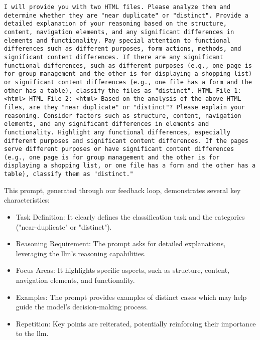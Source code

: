     \begin{lstlisting}[breaklines, caption={Final User Prompt},captionpos=b, label={lst:UsrPrompt}]
    I will provide you with two HTML files. Please analyze them and determine whether they are "near duplicate" or "distinct". Provide a detailed explanation of your reasoning based on the structure, content, navigation elements, and any significant differences in elements and functionality. Pay special attention to functional differences such as different purposes, form actions, methods, and significant content differences. If there are any significant functional differences, such as different purposes (e.g., one page is for group management and the other is for displaying a shopping list) or significant content differences (e.g., one file has a form and the other has a table), classify the files as "distinct". HTML File 1: <html> HTML File 2: <html> Based on the analysis of the above HTML files, are they "near duplicate" or "distinct"? Please explain your reasoning. Consider factors such as structure, content, navigation elements, and any significant differences in elements and functionality. Highlight any functional differences, especially different purposes and significant content differences. If the pages serve different purposes or have significant content differences (e.g., one page is for group management and the other is for displaying a shopping list, or one file has a form and the other has a table), classify them as "distinct."
    \end{lstlisting}
        This prompt, generated through our feedback loop, demonstrates several key characteristics:
        \begin{itemize}
            \item Task Definition: It clearly defines the classification task and the categories ("near-duplicate" or "distinct").
            \item Reasoning Requirement: The prompt asks for detailed explanations, leveraging the \ac{llm}'s reasoning capabilities.
            \item Focus Areas: It highlights specific aspects, such as structure, content, navigation elements, and functionality.
            \item Examples: The prompt provides examples of distinct cases which may help guide the model's decision-making process.
            \item Repetition: Key points are reiterated, potentially reinforcing their importance to the \ac{llm}.
        \end{itemize}

